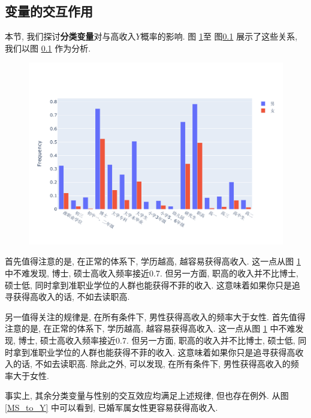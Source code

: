 \documentclass[12pt]{article}
\begin{document}
\subsection{变量的交互作用}
本节, 我们探讨\textbf{分类变量}对与高收入$Y$概率的影响. 图 \ref{ES_to_Y}至 图\ref{} 展示了这些关系, 我们以图 \ref{} 作为分析.
\begin{figure}[htb]
    \setlength{\abovecaptionskip}{-1cm} %
	\setlength{\belowcaptionskip}{-0.8cm} %
	\begin{center}
		\makeatletter
		\def\@captype{figure}
		\makeatother
		\includegraphics[width=5.0in]{images/education_sex.pdf}
		\caption{}
		\label{ES_to_Y}
	\end{center}
\end{figure}
首先值得注意的是, 在正常的体系下, 学历越高, 越容易获得高收入. 这一点从图 \ref{ES_to_Y} 中不难发现, 博士, 硕士高收入频率接近0.7.  但另一方面, 职高的收入并不比博士, 硕士低, 同时拿到准职业学位的人群也能获得不菲的收入. 这意味着如果你只是追寻获得高收入的话, 不如去读职高. \par
另一值得关注的规律是, 在所有条件下, 男性获得高收入的频率大于女性.
首先值得注意的是, 在正常的体系下, 学历越高, 越容易获得高收入. 这一点从图 \ref{ES_to_Y} 中不难发现, 博士, 硕士高收入频率接近0.7.  但另一方面, 职高的收入并不比博士, 硕士低, 同时拿到准职业学位的人群也能获得不菲的收入. 这意味着如果你只是追寻获得高收入的话, 不如去读职高. 除此之外, 可以发现, 在所有条件下, 男性获得高收入的频率大于女性. \par
事实上, 其余分类变量与性别的交互效应均满足上述规律, 但也存在例外. 从图 \ref{MS_to_Y} 中可以看到, 已婚军属女性更容易获得高收入.
\end{document}
